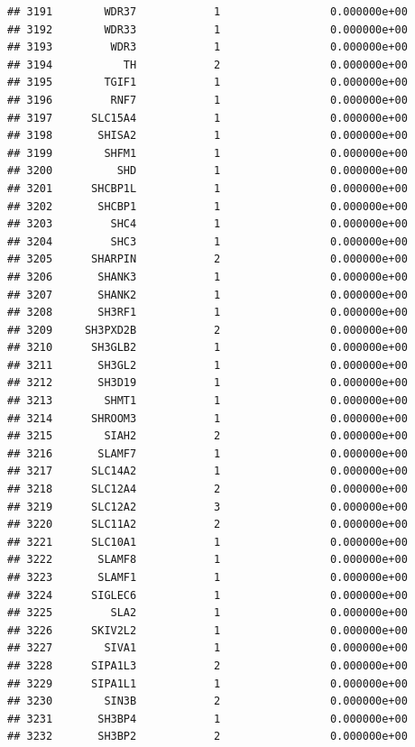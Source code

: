 \documentclass[
]{article}
\begin{document}
\begin{verbatim}
## 3191        WDR37            1                 0.000000e+00
## 3192        WDR33            1                 0.000000e+00
## 3193         WDR3            1                 0.000000e+00
## 3194           TH            2                 0.000000e+00
## 3195        TGIF1            1                 0.000000e+00
## 3196         RNF7            1                 0.000000e+00
## 3197      SLC15A4            1                 0.000000e+00
## 3198       SHISA2            1                 0.000000e+00
## 3199        SHFM1            1                 0.000000e+00
## 3200          SHD            1                 0.000000e+00
## 3201      SHCBP1L            1                 0.000000e+00
## 3202       SHCBP1            1                 0.000000e+00
## 3203         SHC4            1                 0.000000e+00
## 3204         SHC3            1                 0.000000e+00
## 3205      SHARPIN            2                 0.000000e+00
## 3206       SHANK3            1                 0.000000e+00
## 3207       SHANK2            1                 0.000000e+00
## 3208       SH3RF1            1                 0.000000e+00
## 3209     SH3PXD2B            2                 0.000000e+00
## 3210      SH3GLB2            1                 0.000000e+00
## 3211       SH3GL2            1                 0.000000e+00
## 3212       SH3D19            1                 0.000000e+00
## 3213        SHMT1            1                 0.000000e+00
## 3214      SHROOM3            1                 0.000000e+00
## 3215        SIAH2            2                 0.000000e+00
## 3216       SLAMF7            1                 0.000000e+00
## 3217      SLC14A2            1                 0.000000e+00
## 3218      SLC12A4            2                 0.000000e+00
## 3219      SLC12A2            3                 0.000000e+00
## 3220      SLC11A2            2                 0.000000e+00
## 3221      SLC10A1            1                 0.000000e+00
## 3222       SLAMF8            1                 0.000000e+00
## 3223       SLAMF1            1                 0.000000e+00
## 3224      SIGLEC6            1                 0.000000e+00
## 3225         SLA2            1                 0.000000e+00
## 3226      SKIV2L2            1                 0.000000e+00
## 3227        SIVA1            1                 0.000000e+00
## 3228      SIPA1L3            2                 0.000000e+00
## 3229      SIPA1L1            1                 0.000000e+00
## 3230        SIN3B            2                 0.000000e+00
## 3231       SH3BP4            1                 0.000000e+00
## 3232       SH3BP2            2                 0.000000e+00

\end{verbatim}
\end{document}

